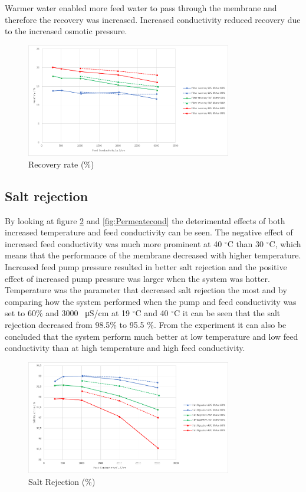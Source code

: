 Warmer water enabled more feed water to pass through the membrane and therefore the recovery was increased. Increased conductivity reduced recovery due to the increased osmotic pressure.

\begin{figure}[H]
    \centering
    \includegraphics[width=0.8\textwidth]{Recovery}
    \caption{Recovery rate (\%)}
    \label{fig:rec}
\end{figure}

\subsection{Salt rejection}

By looking at figure \ref{fig:SaltRejectionResult} and \ref{fig:Permeatecond} the deterimental effects of both increased temperature and feed conductivity can be seen. The negative effect of increased feed conductivity was much more prominent at 40 $^{\circ}$C than 30 $^{\circ}$C, which means that the performance of the membrane decreased with higher temperature. Increased feed pump pressure resulted in better salt rejection and the positive effect of increased pump pressure was larger when the system was hotter. Temperature was the parameter that decreased salt rejection the most and by comparing how the system performed when the pump and feed conductivity was set to 60\% and 3000 \SI{}{\micro\siemens}/cm at 19 $^{\circ}$C and 40 $^{\circ}$C it can be seen that the salt rejection decreased from 98.5\% to 95.5 \%. From the experiment it can also be concluded that the system perform much better at low temperature and low feed conductivity than at high temperature and high feed conductivity. 

\begin{figure}[H]
    \centering
    \includegraphics[width=0.8\textwidth]{SaltRejection}
    \caption{Salt Rejection (\%)}
    \label{fig:SaltRejectionResult}
\end{figure}
 
